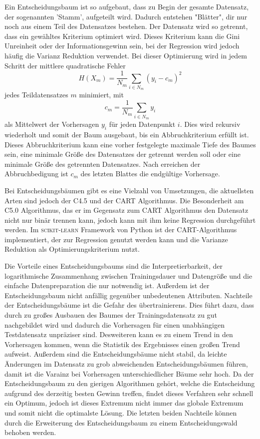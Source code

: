 Ein Entscheidungsbaum ist so aufgebaut, dass zu Begin der gesamte Datensatz, der sogenannten 'Stamm', aufgeteilt wird.
Dadurch entstehen "Blätter", dir nur noch aus einem Teil des Datensatzes bestehen.
Der Datensatz wird so getrennt, dass ein gewähltes Kriterium optimiert wird. Dieses Kriterium
kann die Gini Unreinheit oder der Informationsgewinn sein, bei der Regression wird jedoch häufig die Varianz Reduktion verwendet. Bei dieser Optimierung
wird in jedem Schritt der mittlere quadratische Fehler
\begin{equation}
  H(X_m) = \frac{1}{N_m}\sum_{i\in N_m}(y_i-c_m)^2
\end{equation}
jedes Teildatensatzes $m$ minimiert, mit
\begin{equation}
  c_m = \frac{1}{N_m}\sum_{i\in N_m}y_i
\end{equation}
als Mittelwert der Vorhersagen $y_i$ für jeden Datenpunkt $i$.
Dies wird rekursiv wiederholt und somit der Baum ausgebaut, bis ein Abbruchkriterium erfüllt ist. Dieses Abbruchkriterium kann eine vorher festgelegte maximale Tiefe
des Baumes sein, eine minimale Größe des Datensatzes der getrennt werden soll oder eine minimale Größe des getrennten Datensatzes. Nach erreichen der Abbruchbedigung ist
$c_m$ des letzten Blattes die endgültige Vorhersage.

Bei Entscheidungsbäumen gibt es eine Vielzahl von Umsetzungen, die aktuellsten Arten sind jedoch der C4.5 und der CART Algorithmus\cite[1]{CART}. Die Besonderheit am C5.0 Algorithmus,
das er im Gegensatz zum CART Algorithmus den Datensatz nicht nur binär trennen kann, jedoch kann mit ihm keine Regression durchgeführt werden. Im \textsc{scikit-learn}
Framework\cite{scikit-learn} von Python ist der CART-Algorithmus implementiert, der zur Regression genutzt werden kann und die Varianze Reduktion als Optimierungskriterium nutzt.

Die Vorteile eines Entscheidungsbaums sind die Interpretierbarkeit, der logarithmische Zusammenhang zwischen Trainingsdauer und Datengröße und die einfache Datenpreparation die
nur notwendig ist. Außerdem ist der Entscheidungsbaum nicht anfällig gegenüber unbedeutenen Attributen. Nachteile der Entscheidungsbäume ist die Gefahr des übertrainierens. Dies
führt dazu, dass durch zu großes Ausbauen des Baumes der Trainingsdatensatz zu gut nachgebildet wird und dadurch die Vorhersagen für einen unabhängigen Testdatensatz unpräziser sind.
Desweiteren kann es zu einem Trend in den Vorhersagen kommen, wenn die Statistik des Ergebnisses einen großen Trend aufweist.
Außerdem sind die Entscheidungsbäume nicht stabil, da leichte Änderungen im Datensatz zu grob abweichenden Entscheidungsbäumen führen, damit ist die Varainz bei Vorhersagen
unterschiedlicher Bäume sehr hoch.
Da der Entscheidungsbaum zu den gierigen Algorithmen gehört, welche die Entscheidung aufgrund des derzeitig besten Gewinn treffen, findet dieses Verfahren sehr schnell ein
Optimum, jedoch ist dieses Extremum nicht immer das globale Extremum und somit nicht die optimalste Lösung.
Die letzten beiden Nachteile können durch die Erweiterung des Entscheidungsbaum zu einem Entscheidungswald behoben werden.

